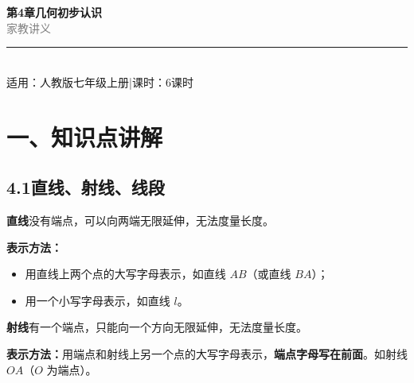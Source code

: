\documentclass[12pt, a4paper]{ctexart}
\begin{document}
\begin{center}
{\Huge\bfseries\textcolor{mainblue}{第4章\quad 几何初步认识}}\\[12pt]
{\Large\textcolor{gray}{家\quad 教\quad 讲\quad 义}}\\[8pt]
\rule{0.6\textwidth}{1pt}\\[8pt]
{\normalsize 适用：人教版\quad 七年级上册\quad |\quad 课时：6课时}
\end{center}
\vspace{10pt}

\section*{\textcolor{mainblue}{一、知识点讲解}}

\subsection*{4.1\quad 直线、射线、线段}

\begin{knowledgebox}[直线]
\textbf{直线}没有端点，可以向两端无限延伸，无法度量长度。

\textbf{表示方法：}
\begin{itemize}[nosep]
  \item 用直线上两个点的大写字母表示，如直线 $AB$（或直线 $BA$）；
  \item 用一个小写字母表示，如直线 $l$。
\end{itemize}

\begin{center}
\end{center}
\end{knowledgebox}

\begin{knowledgebox}[射线]
\textbf{射线}有一个端点，只能向一个方向无限延伸，无法度量长度。

\textbf{表示方法：}用端点和射线上另一个点的大写字母表示，\textbf{端点字母写在前面}。如射线 $OA$（$O$ 为端点）。

\begin{center}
\end{center}
\end{knowledgebox}
\end{document}

